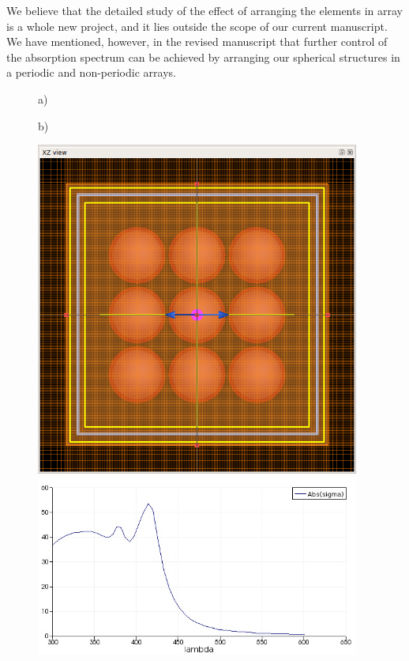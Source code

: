 \documentclass[a4paper]{article}
\begin{document}
We believe that the detailed study of the effect of arranging the elements in array is a whole new project, and it lies outside the scope of our current manuscript. We have mentioned, however, in the revised manuscript that further control of the absorption spectrum can be achieved by arranging our spherical structures in a periodic and non-periodic arrays. 

\begin{figure}
  \begin{minipage}[h]{0.49\textwidth}    \begin{flushleft}     a)    \end{flushleft}
  \end{minipage}
  \begin{minipage}[h]{0.49\textwidth}    \begin{flushleft}     b)    \end{flushleft}
  \end{minipage}
  \begin{minipage}[h]{0.49\textwidth} 
   \includegraphics[width=0.95\textwidth]{fdtd-3x3}
  \end{minipage}
  \begin{minipage}[h]{0.49\textwidth} 
   \includegraphics[width=0.95\textwidth]{fdtd-spectra-3x3}

\end{minipage}
\end{figure}
\end{document}
